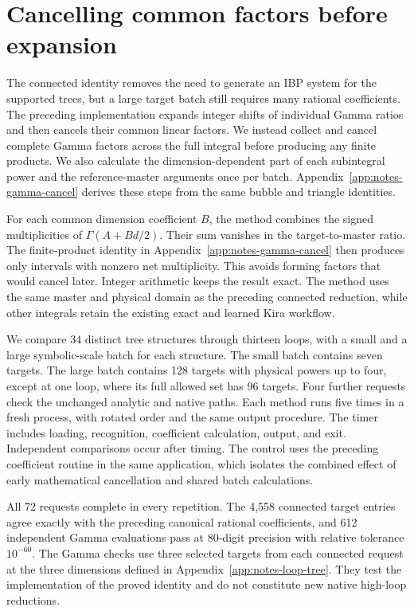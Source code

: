 \section{Cancelling common factors before expansion}
\label{sec:notes-gamma-cancel}
The connected identity removes the need to generate an IBP system for the supported trees, but a large target batch still requires many rational coefficients. The preceding implementation expands integer shifts of individual Gamma ratios and then cancels their common linear factors. We instead collect and cancel complete Gamma factors across the full integral before producing any finite products. We also calculate the dimension-dependent part of each subintegral power and the reference-master arguments once per batch. Appendix~\ref{app:notes-gamma-cancel} derives these steps from the same bubble and triangle identities.

For each common dimension coefficient $B$, the method combines the signed multiplicities of $\Gamma(A+Bd/2)$. Their sum vanishes in the target-to-master ratio. The finite-product identity in Appendix~\ref{app:notes-gamma-cancel} then produces only intervals with nonzero net multiplicity. This avoids forming factors that would cancel later. Integer arithmetic keeps the result exact. The method uses the same master and physical domain as the preceding connected reduction, while other integrals retain the existing exact and learned Kira workflow.

We compare 34 distinct tree structures through thirteen loops, with a small and a large symbolic-scale batch for each structure. The small batch contains seven targets. The large batch contains 128 targets with physical powers up to four, except at one loop, where its full allowed set has 96 targets. Four further requests check the unchanged analytic and native paths. Each method runs five times in a fresh process, with rotated order and the same output procedure. The timer includes loading, recognition, coefficient calculation, output, and exit. Independent comparisons occur after timing. The control uses the preceding coefficient routine in the same application, which isolates the combined effect of early mathematical cancellation and shared batch calculations.

All 72 requests complete in every repetition. The 4,558 connected target entries agree exactly with the preceding canonical rational coefficients, and 612 independent Gamma evaluations pass at 80-digit precision with relative tolerance $10^{-60}$. The Gamma checks use three selected targets from each connected request at the three dimensions defined in Appendix~\ref{app:notes-loop-tree}. They test the implementation of the proved identity and do not constitute new native high-loop reductions.

